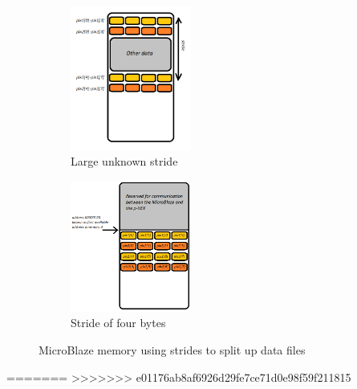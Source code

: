 
\begin{figure}[htb]
	\centering
	\begin{subfigure}{0.3\textwidth}
		\centering
		\includegraphics[width=150px]{Pictures/stride}
		\caption{Large unknown stride}
		\label{fig:stride}
	\end{subfigure}
	\quad
	\begin{subfigure}{0.3\textwidth}
		\centering
		\includegraphics[width=150px]{Pictures/pixels_dmem}
		\caption{Stride of four bytes}
		\label{fig:testpixels}
	\end{subfigure}
\caption{MicroBlaze memory using strides to split up data files}%
\label{}%
\end{figure}
=======
>>>>>>> e01176ab8af6926d29fe7ce71d0e98f59f211815
